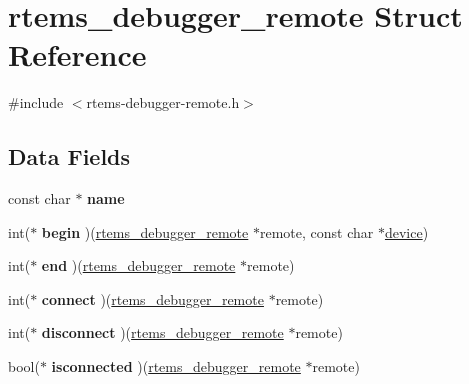\hypertarget{structrtems__debugger__remote}{}\section{rtems\+\_\+debugger\+\_\+remote Struct Reference}
\label{structrtems__debugger__remote}


{\ttfamily \#include $<$rtems-\/debugger-\/remote.\+h$>$}

\subsection*{Data Fields}
\begin{DoxyCompactItemize}
\item 
\mbox{\label{structrtems__debugger__remote_a679bbadbd8df2101b2c3bdf036c58caa}} 
const char $\ast$ {\bfseries name}
\item 
\mbox{\label{structrtems__debugger__remote_a9d6ffb3c08e2e4795919c8e5f9902a26}} 
int($\ast$ {\bfseries begin} )(\mbox{\hyperlink{structrtems__debugger__remote}{rtems\+\_\+debugger\+\_\+remote}} $\ast$remote, const char $\ast$\mbox{\hyperlink{structdevice}{device}})
\item 
\mbox{\label{structrtems__debugger__remote_aa87d1c05cf22f60e437d48d14ea3fc5a}} 
int($\ast$ {\bfseries end} )(\mbox{\hyperlink{structrtems__debugger__remote}{rtems\+\_\+debugger\+\_\+remote}} $\ast$remote)
\item 
\mbox{\label{structrtems__debugger__remote_a25fd73a937e8b3574fbede94300d408c}} 
int($\ast$ {\bfseries connect} )(\mbox{\hyperlink{structrtems__debugger__remote}{rtems\+\_\+debugger\+\_\+remote}} $\ast$remote)
\item 
\mbox{\label{structrtems__debugger__remote_a94768ba0fe929e79326d280e62ae6973}} 
int($\ast$ {\bfseries disconnect} )(\mbox{\hyperlink{structrtems__debugger__remote}{rtems\+\_\+debugger\+\_\+remote}} $\ast$remote)
\item 
\mbox{\label{structrtems__debugger__remote_adbc14f88cae2d6892eb0cae419121367}} 
bool($\ast$ {\bfseries isconnected} )(\mbox{\hyperlink{structrtems__debugger__remote}{rtems\+\_\+debugger\+\_\+remote}} $\ast$remote)

\end{DoxyCompactItemize}
